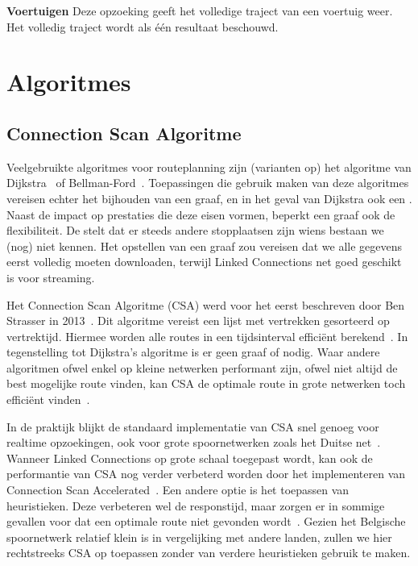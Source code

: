 \textbf{Voertuigen} Deze opzoeking geeft het volledige traject van een voertuig weer. Het volledig traject wordt als één resultaat beschouwd.

\section{Algoritmes}
\label{sec:algoritmes}
\subsection{Connection Scan Algoritme}
\label{sec:csa}
Veelgebruikte algoritmes voor routeplanning zijn (varianten op) het algoritme van Dijkstra~\citep{Dijkstra59, strasser13,hannemann07,hannemann08} of Bellman-Ford~\citep{Bellmanford58}. Toepassingen die gebruik maken van deze algoritmes vereisen echter het bijhouden van een graaf, en in het geval van Dijkstra ook een . Naast de impact op prestaties die deze eisen vormen, beperkt een graaf ook de flexibiliteit. De  stelt dat er steeds andere stopplaatsen zijn wiens bestaan we (nog) niet kennen. Het opstellen van een graaf zou vereisen dat we alle gegevens eerst volledig moeten downloaden, terwijl Linked Connections net goed geschikt is voor streaming. 

Het Connection Scan Algoritme (CSA) werd voor het eerst beschreven door Ben Strasser in 2013~\citep{strasser13}. Dit algoritme vereist een lijst met vertrekken gesorteerd op vertrektijd. Hiermee worden alle routes in een tijdsinterval efficiënt berekend~\citep{strasser14,strasser17}. In tegenstelling tot Dijkstra's algoritme is er geen graaf of  nodig. Waar andere algoritmen ofwel enkel op kleine netwerken performant zijn, ofwel niet altijd de best mogelijke route vinden, kan CSA de optimale route in grote netwerken toch efficiënt vinden~\citep{strasser14}.

In de praktijk blijkt de standaard implementatie van CSA snel genoeg voor realtime opzoekingen, ook voor grote spoornetwerken zoals het Duitse net~\citep{strasser14}. Wanneer Linked Connections op grote schaal toegepast wordt, kan ook de performantie van CSA nog verder verbeterd worden door het implementeren van Connection Scan Accelerated~\citep{strasser14,strasser17}. Een andere optie is het toepassen van heuristieken. Deze verbeteren wel de responstijd, maar zorgen er in sommige gevallen voor dat een optimale route niet gevonden wordt~\citep{hannemann07}. Gezien het Belgische spoornetwerk relatief klein is in vergelijking met andere landen, zullen we hier rechtstreeks CSA op toepassen zonder van verdere heuristieken gebruik te maken. 

